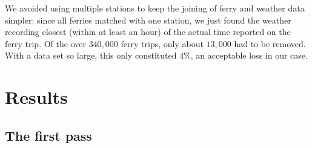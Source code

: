 \documentclass[11pt]{article} %
\begin{document}
We avoided using multiple stations to keep the joining of ferry and weather 
data simpler: since all ferries matched with one station, we just found the 
weather recording closest (within at least an hour) of the actual time reported
on the ferry trip. Of the over $340,000$ ferry trips, only about $13,000$ had to 
be removed.  With a data set so large, this only constituted $4\%$, an acceptable
loss in our case. 



% 
% 
% 
% 

% 
% 

\section{Results}
\label{sec:results}

\subsection{The first pass}
\label{sec:firstpass}
% 
\end{document}
